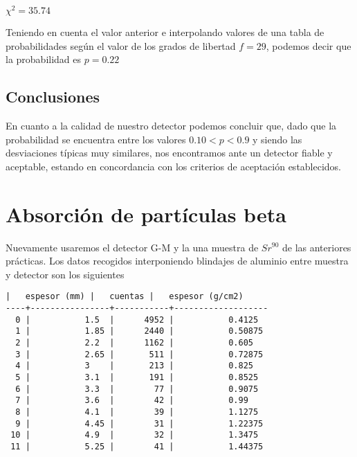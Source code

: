 \documentclass[11pt]{article}
\begin{document}
            
    
    \(\chi^2 = 35.74\)

    
 
            
    
    Teniendo en cuenta el valor anterior e interpolando valores de una tabla
de probabilidades según el valor de los grados de libertad \(f=29\),
podemos decir que la probabilidad es \(p=0.22\)

    

    \hypertarget{conclusiones}{%
\subsection{Conclusiones}\label{conclusiones}}

En cuanto a la calidad de nuestro detector podemos concluir que, dado
que la probabilidad se encuentra entre los valores \(0.10<p<0.9\) y
siendo las desviaciones típicas muy similares, nos encontramos ante un
detector fiable y aceptable, estando en concordancia con los criterios
de aceptación establecidos.

    \hypertarget{absorciuxf3n-de-partuxedculas-beta}{%
\section{Absorción de partículas
beta}\label{absorciuxf3n-de-partuxedculas-beta}}

Nuevamente usaremos el detector G-M y la una muestra de \(Sr^{90}\) de
las anteriores prácticas. Los datos recogidos interponiendo blindajes de
aluminio entre muestra y detector son los siguientes

    \begin{Verbatim}[commandchars=\\\{\}]
    |   espesor (mm) |   cuentas |   espesor (g/cm2)
----+----------------+-----------+-------------------
  0 |           1.5  |      4952 |           0.4125
  1 |           1.85 |      2440 |           0.50875
  2 |           2.2  |      1162 |           0.605
  3 |           2.65 |       511 |           0.72875
  4 |           3    |       213 |           0.825
  5 |           3.1  |       191 |           0.8525
  6 |           3.3  |        77 |           0.9075
  7 |           3.6  |        42 |           0.99
  8 |           4.1  |        39 |           1.1275
  9 |           4.45 |        31 |           1.22375
 10 |           4.9  |        32 |           1.3475
 11 |           5.25 |        41 |           1.44375
    \end{Verbatim}
\end{document}
